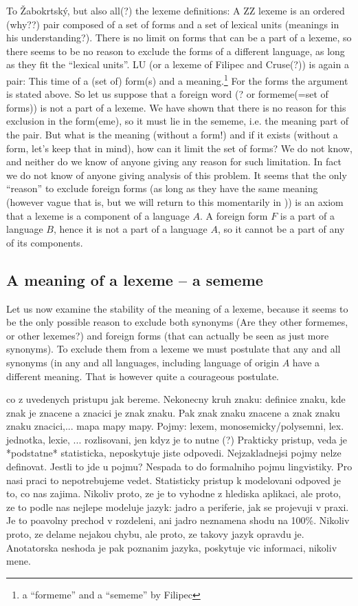 To Žabokrtský, but also all(?) the lexeme definitions: A ZZ lexeme is an ordered (why??) pair composed of a set of forms and a set of lexical units (meanings in his understanding?). There is no limit on forms that can be a part of a lexeme, so there seems to be no reason to exclude the forms of a different language, as long as they fit the ``lexical units''. LU (or a lexeme of Filipec and Cruse(?)) is again a pair: This time of a (set of) form(s) and a meaning.\footnote{a ``formeme'' and a ``sememe'' by Filipec} For the forms the argument is stated above. So let us suppose that a foreign word (? or formeme(=set of forms)) is not a part of a lexeme. We have shown that there is no reason for this exclusion in the form(eme), so it must lie in the sememe, i.e. the meaning part of the pair. But what is the meaning (without a form!) and if it exists (without a form, let's keep that in mind), how can it limit the set of forms? We do not know, and neither do we know of anyone giving any reason for such limitation. In fact we do not know of anyone giving analysis of this problem. It seems that the only ``reason'' to exclude foreign forms (as long as they have the same meaning (however vague that is, but we will return to this momentarily in )) is an axiom that a lexeme is a component of a language $A$. A foreign form $F$ is a part of a language $B$, hence it is not a part of a language $A$, so it cannot be a part of any of its components.

\subsection{A meaning of a lexeme -- a sememe}
\label{sec:meaning-stability}
Let us now examine the stability of the meaning of a lexeme, because it seems to be the only possible reason to exclude both synonyms (Are they other formemes, or other lexemes?) and foreign forms (that can actually be seen as just more synonyms). To exclude them from a lexeme we must postulate that any and all synonyms (in any and all languages, including language of origin $A$ have a different meaning. That is however quite a courageous postulate.

 co z uvedenych pristupu jak bereme. Nekonecny kruh znaku: definice znaku, kde znak je znacene a znacici je znak znaku. Pak znak znaku znacene a znak znaku znaku znacici,... mapa mapy mapy. Pojmy: lexem, monosemicky/polysemni, lex. jednotka, lexie, ... rozlisovani, jen kdyz je to nutne (?) Prakticky pristup, veda je *podstatne* statisticka, neposkytuje jiste odpovedi. Nejzakladnejsi pojmy nelze definovat. Jestli to jde u pojmu? Nespada to do formalniho pojmu lingvistiky. Pro nasi praci to nepotrebujeme vedet. Statisticky pristup k modelovani odpoved je to, co nas zajima. Nikoliv proto, ze je to vyhodne z hlediska aplikaci, ale proto, ze to podle nas nejlepe modeluje jazyk: jadro a periferie, jak se projevuji v praxi. Je to poavolny prechod v rozdeleni, ani jadro neznamena shodu na 100\%. Nikoliv proto, ze delame nejakou chybu, ale proto, ze takovy jazyk opravdu je. Anotatorska neshoda je pak poznanim jazyka, poskytuje vic informaci, nikoliv mene.
